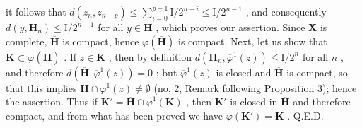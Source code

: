 it follows that \(d(z_n, z_{n+p}) \leqslant \sum_{i=0}^{p-1} \mathrm{I}/2^{n+i} \leqslant \mathrm{I}/2^{n-1}\) , and consequently \(d(y, \mathbf{H}_n) \leqslant \mathrm{I}/2^{n-1}\) for all \(y \in \mathbf{H}\) , which proves our assertion. Since \(\mathbf{X}\) is complete, \(\overline{\mathbf{H}}\) is compact, hence \(\varphi(\overline{\mathbf{H}})\) is compact. Next, let us show that \(\mathbf{K} \subset \varphi(\overline{\mathbf{H}})\) . If \(z \in \mathbf{K}\) , then by definition \(d(\overline{\mathbf{H}}_n, \overline{\varphi}^1(z)) \leqslant \mathrm{I}/2^n\) for all \(n\) , and therefore \(d(\overline{\mathbf{H}}, \overline{\varphi}^1(z)) = 0\) ; but \(\overline{\varphi}^1(z)\) is closed and \(\overline{\mathbf{H}}\) is compact, so that this implies \(\overline{\mathbf{H}} \cap \overline{\varphi}^1(z) \neq \emptyset\) (no. 2, Remark following Proposition 3); hence the assertion. Thus if \(\mathbf{K}' = \overline{\mathbf{H}} \cap \overline{\varphi}^1(\mathbf{K})\) , then \(\mathbf{K}'\) is closed in \(\overline{\mathbf{H}}\) and therefore compact, and from what has been proved we have \(\varphi(\mathbf{K}') = \mathbf{K}\) . Q.E.D.

